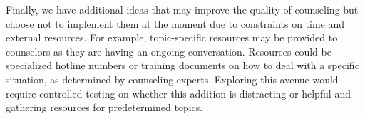 Finally, we have additional ideas that may improve the quality of counseling but choose not to implement them at the moment due to constraints on time and external resources. For example, topic-specific resources may be provided to counselors as they are having an ongoing conversation. Resources could be specialized hotline numbers or training documents on how to deal with a specific situation, as determined by counseling experts. Exploring this avenue would require controlled testing on whether this addition is distracting or helpful and gathering resources for predetermined topics.
